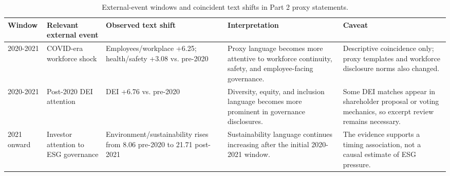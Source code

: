 \begin{table}[htbp]
\centering
\caption{External-event windows and coincident text shifts in Part 2 proxy statements.}
\label{tab:event_shift_interpretation}
\begin{tabular}{lllll}
\hline
Window & Relevant external event & Observed text shift & Interpretation & Caveat \\
\hline
2020-2021 & COVID-era workforce shock & Employees/workplace +6.25; health/safety +3.08 vs. pre-2020 & Proxy language becomes more attentive to workforce continuity, safety, and employee-facing governance. & Descriptive coincidence only; proxy templates and workforce disclosure norms also changed. \\
2020-2021 & Post-2020 DEI attention & DEI +6.76 vs. pre-2020 & Diversity, equity, and inclusion language becomes more prominent in governance disclosures. & Some DEI matches appear in shareholder proposal or voting mechanics, so excerpt review remains necessary. \\
2021 onward & Investor attention to ESG governance & Environment/sustainability rises from 8.06 pre-2020 to 21.71 post-2021 & Sustainability language continues increasing after the initial 2020-2021 window. & The evidence supports a timing association, not a causal estimate of ESG pressure. \\
\hline
\end{tabular}
\end{table}
